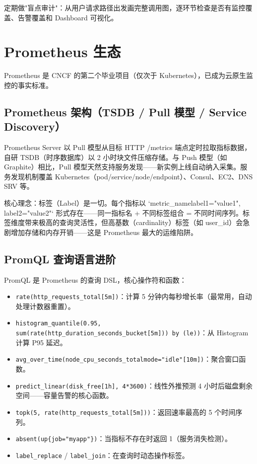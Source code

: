 \documentclass[12pt,UTF8]{ctexbook}
\begin{document}
定期做"盲点审计"：从用户请求路径出发画完整调用图，逐环节检查是否有监控覆盖、告警覆盖和 Dashboard 可视化。

\chapter{Prometheus 生态}
\label{chap:prometheus}

Prometheus 是 CNCF 的第二个毕业项目（仅次于 Kubernetes），已成为云原生监控的事实标准。

  \section{Prometheus 架构（TSDB / Pull 模型 / Service Discovery）}

Prometheus Server 以 Pull 模型从目标 HTTP /metrics 端点定时拉取指标数据，自研 TSDB（时序数据库）以 2 小时块文件压缩存储。与 Push 模型（如 Graphite）相比，Pull 模型天然支持服务发现——新实例上线自动纳入采集。服务发现机制覆盖 Kubernetes（pod/service/node/endpoint）、Consul、EC2、DNS SRV 等。

核心理念：标签（Label）是一切。每个指标以 `metric\_name{label1="value1", label2="value2"}` 形式存在——同一指标名 + 不同标签组合 = 不同时间序列。标签维度带来极高的查询灵活性，但高基数（cardinality）标签（如 user\_id）会急剧增加存储和内存开销——这是 Prometheus 最大的运维陷阱。

  \section{PromQL 查询语言进阶}

PromQL 是 Prometheus 的查询 DSL，核心操作符和函数：

\begin{itemize}
	\item \texttt{rate(http\_requests\_total[5m])}：计算 5 分钟内每秒增长率（最常用，自动处理计数器重置）。
	\item \texttt{histogram\_quantile(0.95, sum(rate(http\_duration\_seconds\_bucket[5m])) by (le))}：从 Histogram 计算 P95 延迟。
	\item \texttt{avg\_over\_time(node\_cpu\_seconds\_total{mode="idle"}[10m])}：聚合窗口函数。
	\item \texttt{predict\_linear(disk\_free[1h], 4*3600)}：线性外推预测 4 小时后磁盘剩余空间——容量告警的核心函数。
	\item \texttt{topk(5, rate(http\_requests\_total[5m]))}：返回速率最高的 5 个时间序列。
	\item \texttt{absent(up\{job="myapp"\})}：当指标不存在时返回 1（服务消失检测）。
	\item \texttt{label\_replace} / \texttt{label\_join}：在查询时动态操作标签。
\end{itemize}
\end{document}
